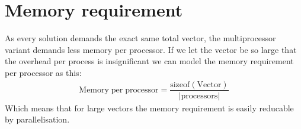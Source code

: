 \section{Memory requirement}
As every solution demands the exact same total vector, the multiprocessor variant demands less memory per processor. If we let the vector be so large that the overhead per process is insignificant we can model the memory requirement per processor as this: 
\begin{align*}
\mathrm{Memory\; per\; processor} =\dfrac{\mathrm{sizeof}\left(\mathrm{Vector}\right)}{|\mathrm{processors}|}
\end{align*}
Which means that for large vectors the memory requirement is easily reducable by parallelisation. 